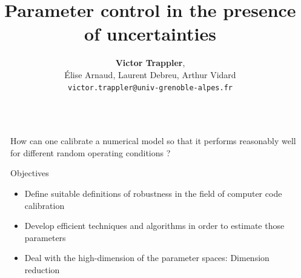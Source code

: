 \documentclass{beamer}
\title{Parameter control in the presence of uncertainties}
\author{ \textbf{Victor Trappler},\\ {\Large Élise Arnaud, Laurent Debreu, Arthur Vidard} \\[.5ex]
  {\large \texttt{victor.trappler@univ-grenoble-alpes.fr}}}
\institute{\large AIRSEA Research team (Inria) -- Laboratoire Jean Kuntzmann \\[2ex]
\textsc{$7^{\mathrm{th}}$ PHD Day, ED MSTII, Grenoble 2018} }
\date{}
\newlength{\sndcolwid}
\newlength{\leftmar}
\newlength{\centercol}
\begin{document}
\begin{frame}[t]
  \begin{columns}[t]
    \begin{column}{\leftmar}\end{column}
    \begin{column}{\centercol}

      
            {\Large How can one calibrate a numerical model so that it performs reasonably well for different random operating conditions ?
}
     \large       
    \begin{alertblock}{Objectives}

    \begin{itemize}
    \item Define suitable \alert{definitions of robustness} in the field of computer code calibration
    \item Develop \alert{efficient} techniques and algorithms in order to estimate those parameters
    \item Deal with the high-dimension of the parameter spaces: \alert{Dimension reduction }
    \end{itemize}
  \end{alertblock}
\end{column}
\end{columns}
\vspace{0.2in}
\begin{columns}[t] %

\begin{column}{\leftmar}\end{column} %

\begin{column}{\sndcolwid} %


\end{column}
\end{columns}
\end{frame}
\end{document}
